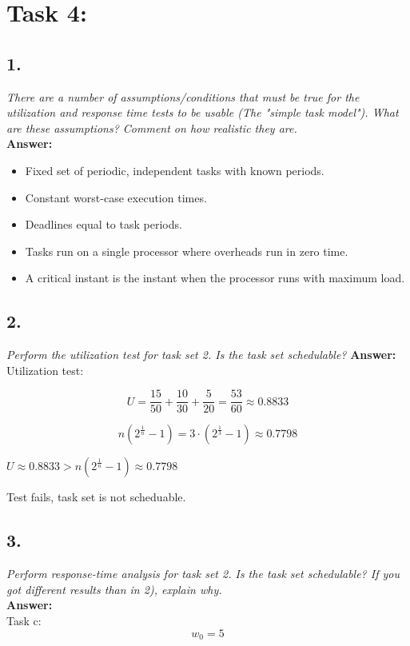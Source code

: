 \documentclass{article}
\begin{document}
    
\section*{Task 4:}
\subsection*{1.}
    \textit{There are a number of assumptions/conditions that must be true for the utilization and response time tests to be usable (The "simple task model"). What are these assumptions? Comment on how realistic they are.} \\
    \textbf{Answer:} \\
    \begin{itemize}
        \item Fixed set of periodic, independent tasks with known periods. 
        \item Constant worst-case execution times.
        \item Deadlines equal to task periods. 
        \item Tasks run on a single processor where overheads run in zero time. 
        \item A critical instant is the instant when the processor runs with maximum load. 
    \end{itemize}

\subsection*{2.}
\textit{Perform the utilization test for task set 2. Is the task set schedulable?}
    \textbf{Answer:} \\
    Utilization test: 
    
    \begin{equation}
        U = \frac{15}{50} + \frac{10}{30} + \frac{5}{20} = \frac{53}{60} \approx 0.8833
    \end{equation}
    
    \begin{equation}
        n (2^{\frac{1}{n}} - 1) = 3 \cdot (2^{\frac{1}{3}} - 1) \approx 0.7798
    \end{equation}
    
    $U \approx 0.8833 > n (2^{\frac{1}{n}} - 1) \approx 0.7798$ 
    
    Test fails, task set is not scheduable.

\subsection*{3.}
\textit{Perform response-time analysis for task set 2. Is the task set schedulable? If you got different results than in 2), explain why.} \\
    \textbf{Answer:} \\
    Task c:
    \begin{equation}
        w_0 = 5
    \end{equation}
    
\end{document}
